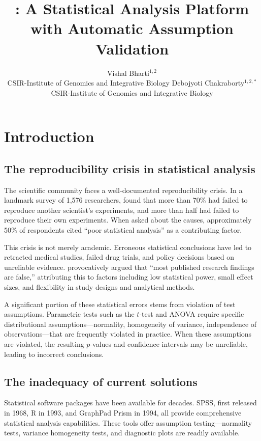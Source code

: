 \documentclass[article]{jss}
\author{
  Vishal Bharti$^{1,2}$\\CSIR-Institute of Genomics and Integrative Biology
  \And
  Debojyoti Chakraborty$^{1,2,*}$\\CSIR-Institute of Genomics and Integrative Biology
}
\title{\pkg{StickForStats}: A Statistical Analysis Platform with Automatic Assumption Validation}
\begin{document}

\section{Introduction} \label{sec:intro}

\subsection{The reproducibility crisis in statistical analysis}

The scientific community faces a well-documented reproducibility crisis. In a landmark survey of 1,576 researchers, \citet{baker2016reproducibility} found that more than 70\% had failed to reproduce another scientist's experiments, and more than half had failed to reproduce their own experiments. When asked about the causes, approximately 50\% of respondents cited ``poor statistical analysis'' as a contributing factor.

This crisis is not merely academic. Erroneous statistical conclusions have led to retracted medical studies, failed drug trials, and policy decisions based on unreliable evidence. \citet{ioannidis2005why} provocatively argued that ``most published research findings are false,'' attributing this to factors including low statistical power, small effect sizes, and flexibility in study designs and analytical methods.

A significant portion of these statistical errors stems from violation of test assumptions. Parametric tests such as the $t$-test and ANOVA require specific distributional assumptions---normality, homogeneity of variance, independence of observations---that are frequently violated in practice. When these assumptions are violated, the resulting $p$-values and confidence intervals may be unreliable, leading to incorrect conclusions.

\subsection{The inadequacy of current solutions}

Statistical software packages have been available for decades. SPSS, first released in 1968, R in 1993, and GraphPad Prism in 1994, all provide comprehensive statistical analysis capabilities. These tools offer assumption testing---normality tests, variance homogeneity tests, and diagnostic plots are readily available.
\end{document}
